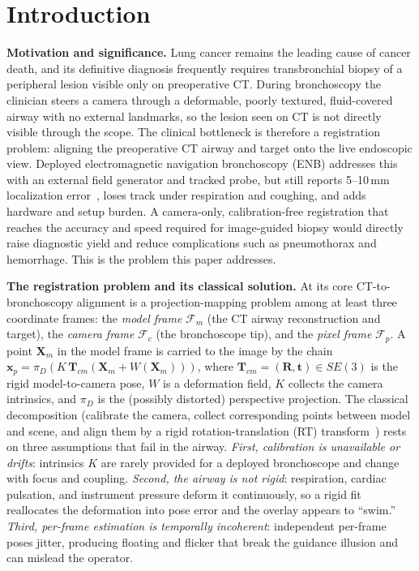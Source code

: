 \documentclass[9pt,twoside,web]{ieeecolor2}
\begin{document}
\section{Introduction}\label{sec:intro}

\textbf{Motivation and significance.} Lung cancer remains the leading cause of cancer death, and its definitive diagnosis frequently requires transbronchial biopsy of a peripheral lesion visible only on preoperative CT. During bronchoscopy the clinician steers a camera through a deformable, poorly textured, fluid-covered airway with no external landmarks, so the lesion seen on CT is not directly visible through the scope. The clinical bottleneck is therefore a registration problem: aligning the preoperative CT airway and target onto the live endoscopic view. Deployed electromagnetic navigation bronchoscopy (ENB) addresses this with an external field generator and tracked probe, but still reports 5--10\,mm localization error~\cite{gildea2006enb}, loses track under respiration and coughing, and adds hardware and setup burden. A camera-only, calibration-free registration that reaches the accuracy and speed required for image-guided biopsy would directly raise diagnostic yield and reduce complications such as pneumothorax and hemorrhage. This is the problem this paper addresses.

\textbf{The registration problem and its classical solution.} At its core CT-to-bronchoscopy alignment is a projection-mapping problem among at least three coordinate frames: the \emph{model frame} $\mathcal{F}_{m}$ (the CT airway reconstruction and target), the \emph{camera frame} $\mathcal{F}_{c}$ (the bronchoscope tip), and the \emph{pixel frame} $\mathcal{F}_{p}$. A point $\mathbf{X}_{m}$ in the model frame is carried to the image by the chain $\mathbf{x}_{p}=\pi_{D}(K\,\mathbf{T}_{cm}(\mathbf{X}_{m}+W(\mathbf{X}_{m})))$, where $\mathbf{T}_{cm}=(\mathbf{R},\mathbf{t})\in SE(3)$ is the rigid model-to-camera pose, $W$ is a deformation field, $K$ collects the camera intrinsics, and $\pi_{D}$ is the (possibly distorted) perspective projection. The classical decomposition (calibrate the camera, collect corresponding points between model and scene, and align them by a rigid rotation-translation (RT) transform~\cite{kabsch1976,umeyama1991,besl1992icp}) rests on three assumptions that fail in the airway. \emph{First, calibration is unavailable or drifts}: intrinsics $K$ are rarely provided for a deployed bronchoscope and change with focus and coupling. \emph{Second, the airway is not rigid}: respiration, cardiac pulsation, and instrument pressure deform it continuously, so a rigid fit reallocates the deformation into pose error and the overlay appears to ``swim.'' \emph{Third, per-frame estimation is temporally incoherent}: independent per-frame poses jitter, producing floating and flicker that break the guidance illusion and can mislead the operator.
\end{document}
